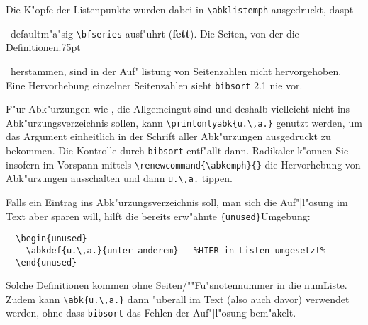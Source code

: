 \documentclass[12pt,a4paper]{article}
\newcommand{\pdfko}[1]{\kern #1pt
                          \strut\ignorespaces}%
\begin{document}
{\batwocolitemdefs\printnumabklist}

\noindent
Die K"opfe der Listenpunkte wurden dabei in \verb|\abklistemph|
ausgedruckt, das\pdfko{1.25}\ 
defaultm"a"sig \verb|\bfseries| ausf"uhrt 
(\textbf{fett}). Die Seiten, von der die Definitionen\pdfko{.75}\  
herstammen, sind 
in der Auf"|listung von Seitenzahlen nicht hervorgehoben. Eine
Hervorhebung einzelner Seitenzahlen sieht \texttt{bibsort} 2.1 nie vor.

F"ur Abk"urzungen wie \printonlyabk{u.\,a.}, die Allgemeingut sind und deshalb
vielleicht nicht ins Abk"urzungsverzeichnis sollen, kann 
\verb|\printonlyabk{u.\,a.}| genutzt werden, um das 
Argument einheitlich in der Schrift aller Abk"urzungen 
ausgedruckt zu bekommen. Die Kontrolle durch \verb|bibsort| entf"allt 
dann. Radikaler k"onnen Sie insofern im Vorspann mittels 
\verb|\renewcommand{\abkemph}{}|
die Hervorhebung von Abk"urzungen ausschalten und dann \verb|u.\,a.| tippen.

Falls ein Eintrag ins Abk"urzungsverzeichnis soll, man sich die 
Auf"|l"osung im Text aber sparen will, hilft die bereits erw"ahnte 
\verb|{unused}|\hy Umgebung:

\vspace{-1.25ex}
{\small
\begin{verbatim}
  \begin{unused}
    \abkdef{u.\,a.}{unter anderem}   %HIER in Listen umgesetzt%
  \end{unused}
\end{verbatim}}
%
  \begin{unused}
  \end{unused}

\vspace{-1ex}\noindent
Solche Definitionen kommen ohne Seiten\fhy/""Fu"snotennummer in die 
num\hy Liste. Zudem kann \verb|\abk{u.\,a.}| dann "uberall im Text 
(also auch davor) verwendet werden, ohne dass \verb|bibsort| das 
Fehlen der Auf"|l"osung bem"akelt. 

%
\end{document}
